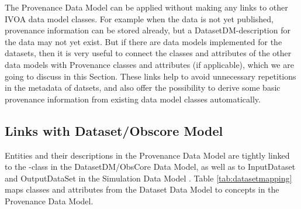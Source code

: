 
The Provenance Data Model can be applied without making any links to other 
IVOA data model classes. For example when the data is not yet published, provenance information
can be stored already, but a DatasetDM-description for the data may not yet exist.
But if there are data models implemented for the datasets, then it is 
very useful to connect the classes and attributes of the other data models with Provenance classes and attributes (if applicable), which we are going to discuss in this Section. These links help to avoid 
unnecessary repetitions in the metadata of datsets, and also offer the possibility 
to derive some basic provenance information from existing data model classes automatically.


\subsection{Links with Dataset/Obscore Model}
Entities and their descriptions in the Provenance Data Model 
are tightly linked to the -class in the DatasetDM/ObsCore Data Model, as well as to 
InputDataset and OutputDataSet in the Simulation Data Model \citep[SimDM,][]{std:SimDM}.
Table \ref{tab:datasetmapping} maps classes and attributes from the Dataset Data Model 
to concepts in the Provenance Data Model.



